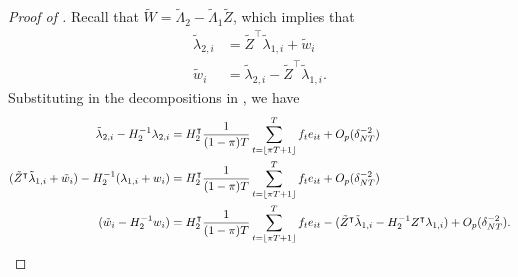 \documentclass[12pt]{article}
\newcommand*{\tran}{\intercal}
\theoremstyle{plain}
\numberwithin{equation}{section}
\begin{document}
\begin{proof}[Proof of ]
Recall that $\tilde{W} = \tilde{\Lambda}_2 - \tilde{\Lambda}_1 \tilde{Z}$, which implies that
\begin{align}
\tilde{\lambda}_{2, i} &= \tilde{Z}^\tran \tilde{\lambda}_{1, i} + \tilde{w}_i \\
\tilde{w}_i &= \tilde{\lambda}_{2, i} - \tilde{Z}^\tran \tilde{\lambda}_{1, i}.
\end{align}
Substituting in the decompositions in , we have
\begin{align*}
\label{eqn:w_ind_asymp_exp}
\tilde{\lambda}_{2, i} - H_2^{-1} \lambda_{2, i} &= 
H_2^\tran \frac{1}{(1 - \pi)T} \sumTfloort f_t e_{it} +  O_p(\delta_{NT}^{-2}) \\
(\tilde{Z}^\tran \tilde{\lambda}_{1, i} + \tilde{w}_i) - 
H_2^{-1} (\lambda_{1, i} + w_{i}) &= H_2^\tran \frac{1}{(1 - \pi)T} \sumTfloort f_t e_{it} +  O_p(\delta_{NT}^{-2}) \\
(\tilde{w}_{i} - H_2^{-1} w_i) &= 
H_2^\tran \frac{1}{(1 - \pi)T} \sumTfloort f_t e_{it} - 
(
	\tilde{Z}^\tran \tilde{\lambda}_{1, i} - H_2^{-1} Z^\tran \lambda_{1, i}
) +
O_p(\delta_{NT}^{-2}).
\end{align*}


\end{proof}
\end{document}
